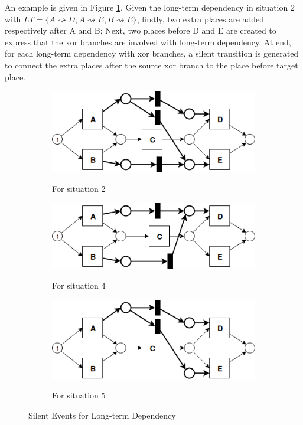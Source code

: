 An example is given in Figure \ref{fig:seq-2-silent-1}. Given the long-term dependency in situation 2 with  $LT=\{ A\rightsquigarrow D, A\rightsquigarrow E, B\rightsquigarrow E\}$, firstly, two extra places are added respectively after A and B; Next, two places before D and E are created to express that the xor branches are involved with long-term dependency. At end, for each long-term dependency with xor branches, a silent transition is generated to connect the extra places after the source xor branch to the place before target place. 
\begin{figure}[!h]
	\centering
	\begin{subfigure}[a]{\textwidth}
		\includegraphics[width=\textwidth]{figures/algorithm/LT_Seq_01_Silent_01.png}
		\label{fig:seq-2-silent-1}
		\caption{For situation 2}
	\end{subfigure}
	\hfill
	\begin{subfigure}[b]{\textwidth}
		\centering
		\includegraphics[width=\linewidth]{figures/algorithm/LT_Seq_01_Silent_03.png}
		\label{fig:seq-2-silent-2}
		\caption{For situation 4}
	\end{subfigure}
	\hfill
	\begin{subfigure}[c]{\textwidth}
		\centering
		\includegraphics[width=\linewidth]{figures/algorithm/LT_Seq_01_Silent_02.png}
		\label{fig:seq-2-silent-3}
		\caption{For situation 5}
	\end{subfigure}
	\label{fig:seq-2-silent-cases}
	\caption{Silent Events for Long-term Dependency}
\end{figure} 

